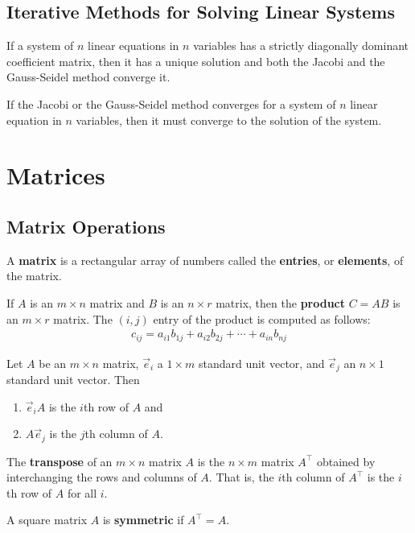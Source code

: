 \documentclass{article}
\begin{document}
\subsection{Iterative Methods for Solving Linear Systems}
\begin{theorem}
    If a system of $n$ linear equations in $n$ variables has a strictly diagonally dominant coefficient matrix, then it has a unique solution and both the Jacobi and the Gauss-Seidel method converge it.
\end{theorem}
\begin{theorem}
    If the Jacobi or the Gauss-Seidel method converges for a system of $n$ linear equation in $n$ variables, then it must converge to the solution of the system.
\end{theorem}
\section{Matrices}
\subsection{Matrix Operations}
\begin{definition}
    A \textbf{matrix} is a rectangular array of numbers called the \textbf{entries}, or \textbf{elements}, of the matrix.
\end{definition}
\begin{definition}
    If $A$ is an $m\times n$ matrix and $B$ is an $n\times r$ matrix, then the \textbf{product} $C=AB$ is an $m\times r$ matrix. The $(i, j)$ entry of the product is computed as follows:
    \begin{gather*}
        c_{ij} = a_{i1}b_{1j}+a_{i2}b_{2j}+\cdots+a_{in}b_{nj}
    \end{gather*}
\end{definition}
\begin{theorem}
    Let $A$ be an $m\times n$ matrix, $\vec e_i$ a $1\times m$ standard unit vector, and $\vec e_j$ an $n\times 1$ standard unit vector. Then
    \begin{enumerate}
        \item $\vec e_iA$ is the $i$th row of $A$ and
        \item $A\vec e_j$ is the $j$th column of $A$.
    \end{enumerate}
\end{theorem}
\begin{definition}
    The \textbf{transpose} of an $m\times n$ matrix $A$ is the $n\times m$ matrix $A^\intercal$ obtained by interchanging the rows and columns of $A$. That is, the $i$th column of $A^\intercal$ is the $i$th row of $A$ for all $i$.
\end{definition}
\begin{definition}
    A square matrix $A$ is \textbf{symmetric} if $A^\intercal = A$.
\end{definition}
\end{document}
